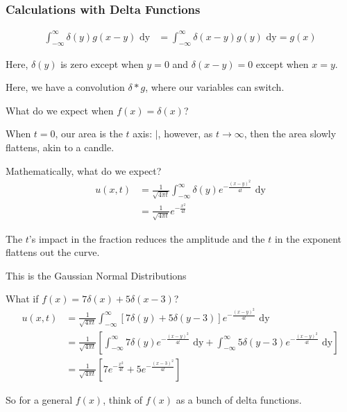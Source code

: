 \subsubsection{Calculations with Delta Functions}
%
\begin{align}
  \int^\infty_{-\infty} \delta(y) g(x - y) \text{ dy}
  & = \int^\infty_{-\infty} \delta(x- y) g(y) \text{ dy} = g(x)
\end{align}

Here, $\delta(y)$ is zero except when $y = 0$ and $\delta(x - y) = 0$ except when $x = y$.

Here, we have a convolution $\delta * g$, where our variables can switch.

What do we expect when $f(x) = \delta(x)$?

When $t = 0$, our area is the $t$ axis: $|$, however, as $t \to \infty$, then the area slowly flattens, akin to a candle.

Mathematically, what do we expect?
%
\begin{align}
  u(x, t) & = \frac{1}{\sqrt{4 \pi t}} \int^\infty_{-\infty} \delta(y) e^{- \frac{(x - y)^2}{4t}} \text{ dy}\\
  & = \frac{1}{\sqrt{4 \pi t}} e^{- \frac{x^2}{4 t}}
\end{align}

The $t$'s impact in the fraction reduces the amplitude and the $t$ in the exponent flattens out the curve.

This is the Gaussian Normal Distributions

What if $f(x) = 7 \delta(x) + 5 \delta(x - 3)$?
%
\begin{align}
  u(x, t) & = \frac{1}{\sqrt{4 \pi t}} \int^\infty_{-\infty} [7 \delta(y) + 5 \delta(y - 3)] e^{-\frac{(x - y)^2}{4 t}} \text{ dy}\\
  & = \frac{1}{\sqrt{4 \pi t}}
  \left[
    \int^\infty_{-\infty} 7 \delta(y) e^{- \frac{(x - y)^2}{4 t}} \text{ dy} +
    \int^\infty_{-\infty} 5 \delta(y - 3) e^{-\frac{(x - y)^2}{4t}} \text{ dy}
  \right]\\
  & = \frac{1}{\sqrt{4 \pi t}}
  \left[
    7e^{- \frac{x^2}{4 t}} + 5 e^{-\frac{(x - 3)^2}{4 t}}
  \right]
\end{align}

So for a general $f(x)$, think of $f(x)$ as a bunch of delta functions.



